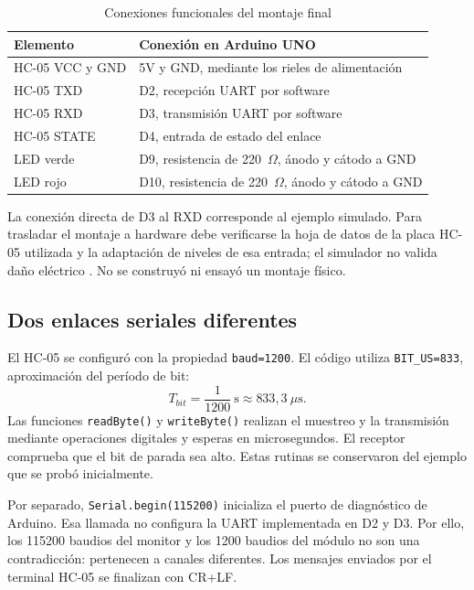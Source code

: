 \documentclass[10pt,a4paper,conference]{IEEEtran}
\begin{document}
\begin{table}[htbp]
\caption{Conexiones funcionales del montaje final}
\label{tab:pines}
\centering\footnotesize
\begin{tabularx}{\columnwidth}{@{}lY@{}}
\toprule
Elemento & Conexión en Arduino UNO \\
\midrule
HC-05 VCC y GND & 5V y GND, mediante los rieles de alimentación \\
HC-05 TXD & D2, recepción UART por software \\
HC-05 RXD & D3, transmisión UART por software \\
HC-05 STATE & D4, entrada de estado del enlace \\
LED verde & D9, resistencia de 220~$\Omega$, ánodo y cátodo a GND \\
LED rojo & D10, resistencia de 220~$\Omega$, ánodo y cátodo a GND \\
\bottomrule
\end{tabularx}
\end{table}

La conexión directa de D3 al RXD corresponde al ejemplo simulado. Para trasladar el montaje a hardware debe verificarse la hoja de datos de la placa HC-05 utilizada y la adaptación de niveles de esa entrada; el simulador no valida daño eléctrico \cite{modelo}. No se construyó ni ensayó un montaje físico.

\subsection{Dos enlaces seriales diferentes}
El HC-05 se configuró con la propiedad \texttt{baud=1200}. El código utiliza \texttt{BIT\_US=833}, aproximación del período de bit:
\begin{equation}
T_{bit}=\frac{1}{1200}\ \mathrm{s}\approx833{,}3\ \mu\mathrm{s}.
\end{equation}
Las funciones \texttt{readByte()} y \texttt{writeByte()} realizan el muestreo y la transmisión mediante operaciones digitales y esperas en microsegundos. El receptor comprueba que el bit de parada sea alto. Estas rutinas se conservaron del ejemplo que se probó inicialmente.

Por separado, \texttt{Serial.begin(115200)} inicializa el puerto de diagnóstico de Arduino. Esa llamada no configura la UART implementada en D2 y D3. Por ello, los 115200 baudios del monitor y los 1200 baudios del módulo no son una contradicción: pertenecen a canales diferentes. Los mensajes enviados por el terminal HC-05 se finalizan con CR+LF.
\end{document}

